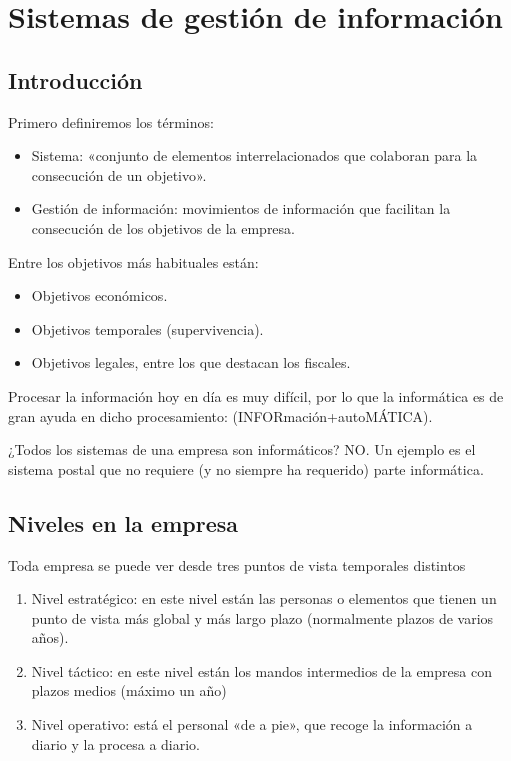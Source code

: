 \documentclass[letterpaper,10pt,spanish]{sphinxmanual}
\begin{document}
\chapter{Sistemas de gestión de información}
\label{\detokenize{tema8:sistemas-de-gestion-de-informacion}}\label{\detokenize{tema8::doc}}

\section{Introducción}
\label{\detokenize{tema8:introduccion}}
Primero definiremos los términos:
\begin{itemize}
\item {} 
Sistema: «conjunto de elementos interrelacionados que colaboran para la consecución de un objetivo».

\item {} 
Gestión de información: movimientos de información que facilitan la consecución de los objetivos de la empresa.

\end{itemize}

Entre los objetivos más habituales están:
\begin{itemize}
\item {} 
Objetivos económicos.

\item {} 
Objetivos temporales (supervivencia).

\item {} 
Objetivos legales, entre los que destacan los fiscales.

\end{itemize}

Procesar la información hoy en día es muy difícil, por lo que la informática es de gran ayuda en dicho procesamiento: (INFORmación+autoMÁTICA).

¿Todos los sistemas de una empresa son informáticos? NO. Un ejemplo es el sistema postal que no requiere (y no siempre ha requerido) parte informática.


\section{Niveles en la empresa}
\label{\detokenize{tema8:niveles-en-la-empresa}}
Toda empresa se puede ver desde tres puntos de vista temporales distintos
\begin{enumerate}
\item {} 
Nivel estratégico: en este nivel están las personas o elementos que tienen un punto de vista más global y más largo plazo (normalmente plazos de varios años).

\item {} 
Nivel táctico: en este nivel están los mandos intermedios de la empresa con plazos medios (máximo un año)

\item {} 
Nivel operativo: está el personal «de a pie», que recoge la información a diario y la procesa a diario.

\end{enumerate}
\end{document}
